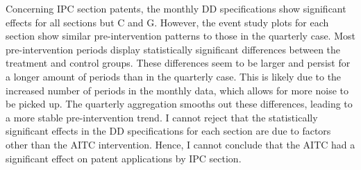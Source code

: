 \documentclass[../main.tex]{subfiles}
\begin{document}
Concerning IPC section patents, the monthly DD specifications show significant effects for all sections but C and G. However, the event study plots for each section show similar pre-intervention patterns to those in the quarterly case. Most pre-intervention periods display statistically significant differences between the treatment and control groups. These differences seem to be larger and persist for a longer amount of periods than in the quarterly case. This is likely due to the increased number of periods in the monthly data, which allows for more noise to be picked up. The quarterly aggregation smooths out these differences, leading to a more stable pre-intervention trend. I cannot reject that the statistically significant effects in the DD specifications for each section are due to factors other than the AITC intervention. Hence, I cannot conclude that the AITC had a significant effect on patent applications by IPC section.
\end{document}
